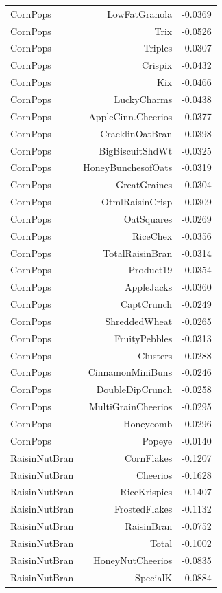 \begin{longtable}{@{}lrr@{}}
CornPops & LowFatGranola & -0.0369 \\
CornPops & Trix & -0.0526 \\
CornPops & Triples & -0.0307 \\
CornPops & Crispix & -0.0432 \\
CornPops & Kix & -0.0466 \\
CornPops & LuckyCharms & -0.0438 \\
CornPops & AppleCinn.Cheerios & -0.0377 \\
CornPops & CracklinOatBran & -0.0398 \\
CornPops & BigBiscuitShdWt & -0.0325 \\
CornPops & HoneyBunchesofOats & -0.0319 \\
CornPops & GreatGraines & -0.0304 \\
CornPops & OtmlRaisinCrisp & -0.0309 \\
CornPops & OatSquares & -0.0269 \\
CornPops & RiceChex & -0.0356 \\
CornPops & TotalRaisinBran & -0.0314 \\
CornPops & Product19 & -0.0354 \\
CornPops & AppleJacks & -0.0360 \\
CornPops & CaptCrunch & -0.0249 \\
CornPops & ShreddedWheat & -0.0265 \\
CornPops & FruityPebbles & -0.0313 \\
CornPops & Clusters & -0.0288 \\
CornPops & CinnamonMiniBuns & -0.0246 \\
CornPops & DoubleDipCrunch & -0.0258 \\
CornPops & MultiGrainCheerios & -0.0295 \\
CornPops & Honeycomb & -0.0296 \\
CornPops & Popeye & -0.0140 \\
RaisinNutBran & CornFlakes & -0.1207 \\
RaisinNutBran & Cheerios & -0.1628 \\
RaisinNutBran & RiceKrispies & -0.1407 \\
RaisinNutBran & FrostedFlakes & -0.1132 \\
RaisinNutBran & RaisinBran & -0.0752 \\
RaisinNutBran & Total & -0.1002 \\
RaisinNutBran & HoneyNutCheerios & -0.0835 \\
RaisinNutBran & SpecialK & -0.0884 \\

\end{longtable}

